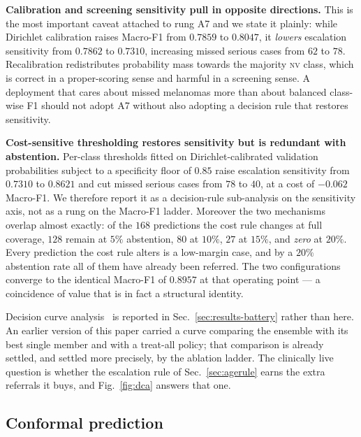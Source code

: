 \documentclass[journal]{IEEEtran}
\begin{document}
\textbf{Calibration and screening sensitivity pull in opposite directions.} This is the most
important caveat attached to rung A7 and we state it plainly: while Dirichlet calibration
raises Macro-F1 from $0.7859$ to $0.8047$, it \emph{lowers} escalation sensitivity from
$0.7862$ to $0.7310$, increasing missed serious cases from $62$ to $78$. Recalibration
redistributes probability mass towards the majority \textsc{nv} class, which is correct in a
proper-scoring sense and harmful in a screening sense. A deployment that cares about missed
melanomas more than about balanced class-wise F1 should not adopt A7 without also adopting a
decision rule that restores sensitivity.

\textbf{Cost-sensitive thresholding restores sensitivity but is redundant with abstention.}
Per-class thresholds fitted on Dirichlet-calibrated validation probabilities subject to a
specificity floor of $0.85$ raise escalation sensitivity from $0.7310$ to $0.8621$ and cut
missed serious cases from $78$ to $40$, at a cost of $-0.062$ Macro-F1. We therefore report
it as a decision-rule sub-analysis on the sensitivity axis, not as a rung on the Macro-F1
ladder. Moreover the two mechanisms overlap almost exactly: of the $168$ predictions the cost
rule changes at full coverage, $128$ remain at $5\%$ abstention, $80$ at $10\%$, $27$ at
$15\%$, and \emph{zero} at $20\%$. Every prediction the cost rule alters is a low-margin
case, and by a $20\%$ abstention rate all of them have already been referred. The two
configurations converge to the identical Macro-F1 of $0.8957$ at that operating point ---
a coincidence of value that is in fact a structural identity.

Decision curve analysis~\cite{vickers2006dca} is reported in
Sec.~\ref{sec:results-battery} rather than here. An earlier version of this paper carried a
curve comparing the ensemble with its best single member and with a treat-all policy; that
comparison is already settled, and settled more precisely, by the ablation ladder. The
clinically live question is whether the escalation rule of Sec.~\ref{sec:agerule} earns the
extra referrals it buys, and Fig.~\ref{fig:dca} answers that one.

\subsection{Conformal prediction}
\label{sec:results-conformal}
\end{document}
